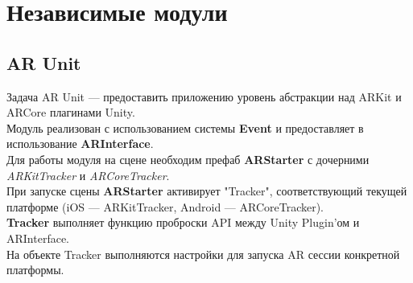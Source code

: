 \documentclass[a4paper, 11pt, titlepage]{article}
\begin{document}
{\begin{center}
      \end{center}
    }
  \section{Независимые модули}
    \subsection{AR Unit}
      Задача AR Unit --- предоставить приложению уровень абстракции над ARKit и ARCore плагинами Unity. \\
      Модуль реализован с использованием системы \textbf{Event} и предоставляет в использование \textbf{ARInterface}. \\
      Для работы модуля на сцене необходим префаб \textbf{ARStarter} с дочерними \textit{ARKitTracker} и 
      \textit{ARCoreTracker}. \\
      При запуске сцены \textbf{ARStarter} активирует "Tracker"{}, соответствующий текущей платформе (iOS ---  ARKitTracker, Android --- ARCoreTracker).\\
      \textbf{Tracker} выполняет функцию проброски API между Unity Plugin'ом и ARInterface. \\
      На объекте Tracker выполняются настройки для запуска AR сессии конкретной платформы.
\end{document}

